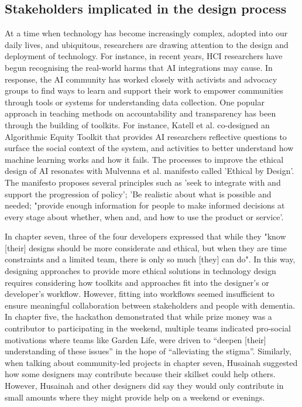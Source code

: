 \subsection{Stakeholders implicated in the design process}
\label{DevsDesigners}
At a time when technology has become increasingly complex, adopted into our daily lives, and ubiquitous, researchers are drawing attention to the design and deployment of technology. For instance, in recent years, HCI researchers have begun recognising the 
real-world harms that AI integrations may cause. In response, the AI community has worked closely with activists and advocacy groups to find ways to learn and support their work to empower communities through tools or systems for understanding data collection. One popular approach in teaching methods on accountability and transparency has been through the building of toolkits. For instance, Katell et al. co-designed an Algorithmic Equity Toolkit that provides AI researchers reflective questions to surface the social context of the system, and activities to better understand how machine learning works and how it fails. The processes to improve the ethical design of AI resonates with Mulvenna et al. manifesto called 'Ethical by Design'. The manifesto proposes several principles such as 'seek to integrate with and support the progression of policy'; 'Be realistic about what is possible and needed; "provide enough information for people to make informed decisions at every stage about whether, when and, and how to use the product or service'. 

In chapter seven, three of the four developers expressed that while they "know [their] designs should be more considerate and ethical,   but when they are time constraints and a limited team, there is only so much [they] can do". In this way, designing approaches to provide more ethical solutions in technology design requires considering how toolkits and approaches fit into the designer's or developer's workflow. However, fitting into workflows seemed insufficient to ensure meaningful collaboration between stakeholders and people with dementia. In chapter five, the hackathon demonstrated that while prize money was a contributor to participating in the weekend, multiple teams indicated pro-social motivations where teams like Garden Life, were driven to ``deepen [their] understanding of these issues'' in the hope of ``alleviating the stigma''. Similarly, when talking about community-led projects in chapter seven, Husainah suggested how some designers may contribute because their skillset could help others. However, Husainah and other designers did say they would only contribute in small amounts where they might provide help on a weekend or evenings. 


